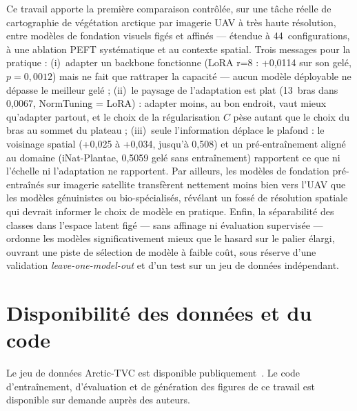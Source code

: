 \documentclass[11pt,a4paper]{article}
\begin{document}
Ce travail apporte la première comparaison contrôlée, sur une tâche réelle de cartographie de végétation arctique par imagerie UAV à très haute résolution, entre modèles de fondation visuels figés et affinés — étendue à 44~configurations, à une ablation PEFT systématique et au contexte spatial. Trois messages pour la pratique : (i)~adapter un backbone fonctionne (LoRA r=8 : +0,0114 sur son gelé, $p=0{,}0012$) mais ne fait que rattraper la capacité — aucun modèle déployable ne dépasse le meilleur gelé ; (ii)~le paysage de l'adaptation est plat (13~bras dans 0,0067, NormTuning = LoRA) : adapter moins, au bon endroit, vaut mieux qu'adapter partout, et le choix de la régularisation $C$ pèse autant que le choix du bras au sommet du plateau ; (iii)~seule l'information déplace le plafond : le voisinage spatial (+0,025 à +0,034, jusqu'à 0,508) et un pré-entraînement aligné au domaine (iNat-Plantae, 0,5059 gelé sans entraînement) rapportent ce que ni l'échelle ni l'adaptation ne rapportent. Par ailleurs, les modèles de fondation pré-entraînés sur imagerie satellite transfèrent nettement moins bien vers l'UAV que les modèles génuinistes ou bio-spécialisés, révélant un fossé de résolution spatiale qui devrait informer le choix de modèle en pratique. Enfin, la séparabilité des classes dans l'espace latent figé — sans affinage ni évaluation supervisée — ordonne les modèles significativement mieux que le hasard sur le palier élargi, ouvrant une piste de sélection de modèle à faible coût, sous réserve d'une validation \emph{leave-one-model-out} et d'un test sur un jeu de données indépendant.

\section*{Disponibilité des données et du code}

Le jeu de données Arctic-TVC est disponible publiquement~\autocite{tvc2025}. Le code d'entraînement, d'évaluation et de génération des figures de ce travail est disponible sur demande auprès des auteurs.

\printbibliography
\end{document}
